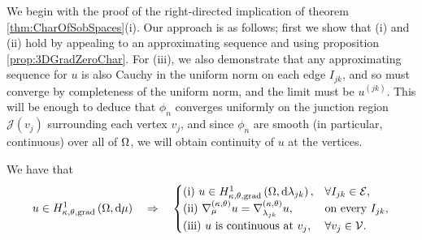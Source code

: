 We begin with the proof of the right-directed implication of theorem \ref{thm:CharOfSobSpaces}(i).
Our approach is as follows; first we show that (i) and (ii) hold by appealing to an approximating sequence and using proposition \ref{prop:3DGradZeroChar}.
For (iii), we also demonstrate that any approximating sequence for $u$ is also Cauchy in the uniform norm on each edge $I_{jk}$, and so must converge by completeness of the uniform norm, and the limit must be $u^{(jk)}$.
This will be enough to deduce that $\phi_n$ converges uniformly on the junction region $\mathcal{J}(v_j)$ surrounding each vertex $v_j$, and since $\phi_n$ are smooth (in particular, continuous) over all of $\Omega$, we will obtain continuity of $u$ at the vertices.
\begin{theorem} \label{thm:3DTangGradGraph}
	We have that
	\begin{align*}
		u\in H^1_{\kappa,\theta,\mathrm{grad}}\left( \Omega, \mathrm{d}\mu \right) \quad\Rightarrow\quad
		\begin{cases}
			\mathrm{(i)} \ u\in H^1_{\kappa,\theta,\mathrm{grad}}\left( \Omega, \mathrm{d}\lambda_{jk} \right), & \forall I_{jk}\in\mathcal{E}, \\
			\mathrm{(ii)} \ \nabla^{\left( \kappa, \theta \right)}_{\mu}u = \nabla^{\left( \kappa, \theta \right)}_{\lambda_{jk}}u, & \text{on every } I_{jk}, \\
			\mathrm{(iii)} \ u \text{ is continuous at } v_j, & \forall v_j\in\mathcal{V}.
		\end{cases}
	\end{align*}
\end{theorem}
